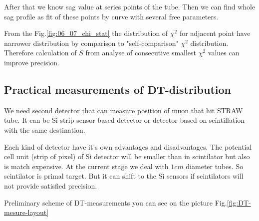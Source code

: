 	After that we know sag value at series points of the tube. Then we can find whole sag profile as fit of these points by curve with several free parameters.
	
	From the Fig.\ref{fig:06_07_chi_stat} the distribution of $\chi^2$ for adjacent point have narrower distribution by comparison to "self-comparison" $\chi^2$ distribution. Therefore calculation of $S$ from analyse of consecutive smallest $\chi^2$ values can improve precision.
		
	
	\subsection{Practical measurements of DT-distribution}
	
	We need second detector that can measure position of muon that hit STRAW tube. It can be Si strip sensor based detector or detector based on  scintillation with the same destination.
	
	Each kind of detector have it's own advantages and disadvantages. The potential cell unit (strip of pixel) of Si detector will be smaller than in scintilator but also is match expensive. At the current stage we deal with $1cm$ diameter tubes. So scintilator is primal target. But it can shift to the Si sensors if scintilators will not provide satisfied precision. 
	
	Preliminary scheme of DT-measurements you can see on the picture Fig.\ref{fig:DT-mesure-layout}
	
